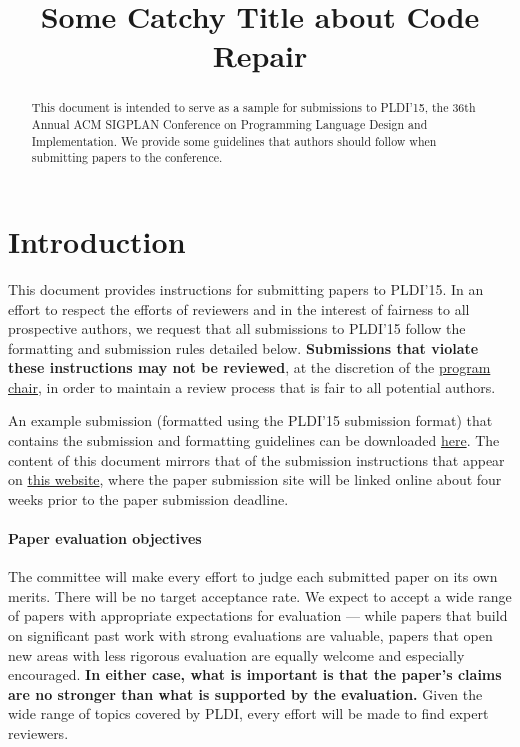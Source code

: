 \documentclass[pldi]{sigplanconf}
\begin{document}
\title{Some Catchy Title about Code Repair}

\maketitle


\maketitle
\begin{abstract}
  This document is intended to serve as a sample for submissions to PLDI'15,
  the 36th Annual ACM SIGPLAN Conference on Programming Language
  Design and Implementation.  We provide some guidelines
  that authors should follow when submitting papers to the conference.
\end{abstract}

\section{Introduction}

This document provides instructions for submitting papers to PLDI'15.
In an effort to respect the efforts of reviewers and in the interest
of fairness to all prospective authors, we request that all
submissions to PLDI'15 follow the formatting and submission rules
detailed below. \textbf{Submissions that violate these instructions
  may not be reviewed}, at the discretion of the
\href{mailto:steve.blackburn@anu.edu.au?subject=[PLDI'15]}{program
  chair}, in order to maintain a review process that is fair to all
potential authors.

An example submission (formatted using the PLDI'15 submission format)
that contains the submission and formatting guidelines can be
downloaded
\href{http://conf.researchr.org/getImage/pldi2015/orig/pldi15-template.pdf}{here}. The
content of this document mirrors that of the submission instructions
that appear on
\href{http://conf.researchr.org/track/pldi2015/pldi2015-papers#Submission-Instructions}{this website},
where the paper submission site will be linked online about four weeks
prior to the paper submission deadline.

\paragraph{Paper evaluation objectives}
The committee will make every effort to judge each submitted paper on
its own merits. There will be no target acceptance rate.  We expect to
accept a wide range of papers with appropriate expectations for
evaluation --- while papers that build on significant past work with
strong evaluations are valuable, papers that open new areas with less
rigorous evaluation are equally welcome and especially
encouraged. \textbf{In either case, what is important is that the
  paper's claims are no stronger than what is supported by the
  evaluation.}  Given the wide range of topics covered by PLDI, every
effort will be made to find expert reviewers.
\end{document}
